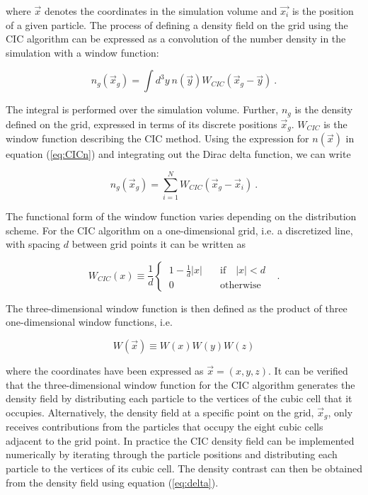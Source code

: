 \documentclass[10pt,letterpaper,final]{iopart}
\numberwithin{equation}{subsection}
\def\ni{\noindent}
\begin{document}
\ni where $\vec{x}$ denotes the coordinates in the simulation volume and $\vec{x_i}$ is the position of a given particle. The process of defining a density field on the grid using the CIC algorithm can be expressed as a convolution of the number density in the simulation with a window function:

\begin{equation}\label{eq:CICng}
n_g(\vec{x}_g) = \int d^3y \ n(\vec{y})W_{CIC}(\vec{x}_g - \vec{y}) \ .
\end{equation}

\ni The integral is performed over the simulation volume. Further, $n_g$ is the density defined on the grid, expressed in terms of its discrete positions $\vec{x}_g$. $W_{CIC}$ is the window function describing the CIC method. Using the expression for $n(\vec{x})$ in equation (\ref{eq:CICn}) and integrating out the Dirac delta function, we can write

\begin{equation}\label{eq:CICng2}
n_g(\vec{x}_g) = \sum_{i=1}^{N} W_{CIC}(\vec{x}_g - \vec{x}_i) \ .
\end{equation} 

\ni The functional form of the window function varies depending on the distribution scheme. For the CIC algorithm on a one-dimensional grid, i.e. a discretized line, with spacing $d$ between grid points it can be written as

\begin{equation}
W_{CIC}(x) \equiv \frac{1}{d}\begin{cases} \ 1- \frac{1}{d}\left | x \right | &\quad \text{if} \quad \left | x  \right | < d  \\  \ 0  &\quad \text{otherwise} \quad \end{cases} \ .
\end{equation}
 
\ni The three-dimensional window function is then defined as the product of three one-dimensional window functions, i.e.

\begin{equation}
W(\vec{x}) \equiv W(x)W(y)W(z) 
\end{equation}

\ni where the coordinates have been expressed as $\vec{x} = (x,y,z)$. It can be verified that the three-dimensional window function for the CIC algorithm generates the density field by  distributing each particle to the vertices of the cubic cell that it occupies. Alternatively, the density field at a specific point  on the grid, $\vec{x}_g$, only receives contributions from the particles that occupy the eight cubic cells adjacent to the grid point. In practice the CIC density field can be implemented numerically by iterating through the particle positions and distributing each particle to the vertices of its cubic cell. The density contrast can then be obtained from the density field using equation (\ref{eq:delta}). 
\end{document}
